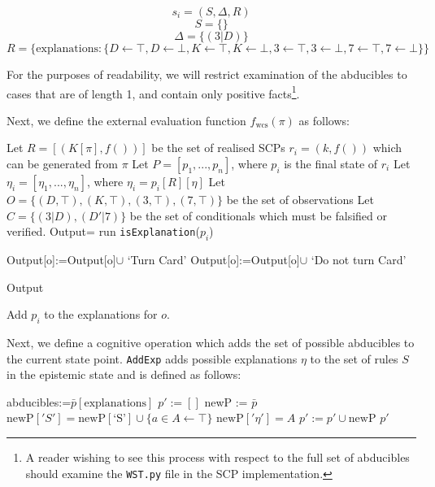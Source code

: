 \[
s_i=(S,\Delta, R)
\]
\[
S=\{\}
\]
\[
\Delta=\{(3|D)\}
\]
\[
R=\{\text{explanations}:\{D\leftarrow \top, D \leftarrow \bot, K\leftarrow \top, K \leftarrow \bot, 3\leftarrow \top, 3 \leftarrow \bot, 7\leftarrow \top, 7\leftarrow \bot\}\}
\]

For the purposes of readability, we will restrict examination of the abducibles to cases that are of length 1, and contain only positive facts\footnote{A reader wishing to see this process with respect to the full set of abducibles should examine the \texttt{WST.py} file in the SCP implementation.}.

Next, we define the external evaluation function $f_\text{wcs}(\pi)$ as follows:

\begin{algorithm}[H] \label{cogOp:wcs}
\SetAlgoLined
{}
{
Let $R=[(K[\pi],f())]$ be the set of realised SCPs $r_i=(k,f())$ which can be generated from $\pi$\;
Let $P=[p_1,...,p_n]$, where $p_i$ is the final state of $r_i$\;
Let $\eta_i=[\eta_1,...,\eta_n]$, where $\eta_i=p_i[R][\eta]$\;
Let $O=\{(D,\top),(K,\top),(3,\top),(7,\top)\}$ be the set of observations\;
Let $C=\{(3|D), (D' | 7)\}$ be the set of conditionals which must be falsified or verified.\;
Output={}\;
{
run \texttt{isExplanation}($p_i$)\;
}

{
{
Output[o]:=Output[o]$\cup$ `Turn Card'\;
}
\Else
{
Output[o]:=Output[o]$\cup$ `Do not turn Card'\;
}
}

\Return Output
}
{
{
Add $p_i$ to the explanations for $o$.
}
}

\caption{$\texttt{f}_\text{WST}$}
\end{algorithm}

Next, we define a cognitive operation which adds the set of possible abducibles to the current state point. \texttt{AddExp} adds possible explanations $\eta$ to the set of rules $S$ in the epistemic state and is defined as follows:

\begin{algorithm}[H] \label{cogOp:wcs}
\SetAlgoLined
{}
{
abducibles:=$\bar{p}[\text{explanations}]$\;
$p':=[]$\;
{
newP := $\bar{p}$\;
$\text{newP}['S']=\text{newP}[\text{`S'}] \cup \{a \in A\leftarrow \top\}$\;
$\text{newP}['\eta']=A$\;
$p':=p' \cup \text{newP}$\;
}
\Return $p'$
}

\caption{$\texttt{addExp}$}
\end{algorithm}






